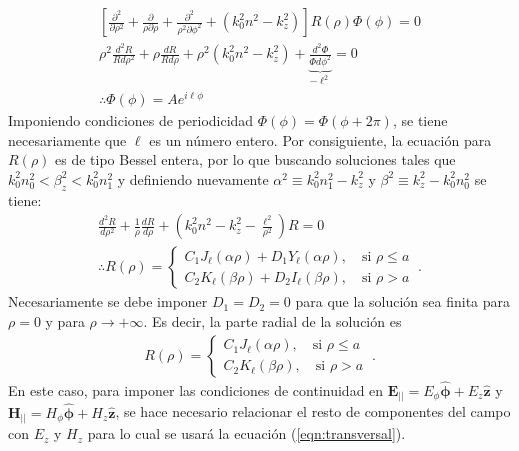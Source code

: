 \begin{align}
	\left[\frac{\partial^2}{\partial \rho^2} + \frac{\partial}{\rho\partial \rho} + \frac{\partial^2}{\rho^2\partial \phi^2} +\left( k_0^2n^2 - k_z^2 \right)\right]  R(\rho)\Phi(\phi) = 0
	\nonumber
	\\
\rho^2\frac{d^2 R}{Rd\rho^2} + \rho\frac{dR}{Rd\rho} + \rho^2\left( k_0^2n^2 - k_z^2 \right) + \underbrace{\frac{d^2 \Phi}{\Phi d\phi^2}}_{-\ell^2} = 0
\nonumber
\\
\therefore \Phi(\phi) = A e^{i\ell\phi}
\nonumber
\end{align}
Imponiendo condiciones de periodicidad $\Phi(\phi)=\Phi(\phi + 2\pi)$, se tiene necesariamente que $\ell$ es un número entero. Por consiguiente, la ecuación para $R(\rho)$ es de tipo Bessel entera, por lo que buscando soluciones tales que $k_0^2 n_0^2 < \beta_z^2 < k_0^2 n_1^2$ y definiendo nuevamente $\alpha^2 \equiv k_0^2n_1^2 - k_z^2$ y $\beta^2\equiv k_z^2 - k_0^2n_0^2$ se tiene:
\begin{align}
	\frac{d^2 R}{d\rho^2} + \frac{1}{\rho}\frac{dR}{d\rho} + \left( k_0^2n^2 - k_z^2 -\frac{\ell^2}{\rho^2}\right)R  = 0
	\nonumber
	\\
	\therefore R(\rho) = 
	\left\{
	\begin{matrix}	
	C_1 J_\ell (\alpha\rho) + D_1 Y_\ell (\alpha\rho), \quad \text{si } \rho \le a  
	\\
	C_2 K_\ell (\beta\rho) + D_2 I_\ell (\beta\rho), \quad \text{si } \rho > a  
	\end{matrix}
	\right.
	\ . \nonumber
\end{align}
Necesariamente se debe imponer $D_1 = D_2 = 0$ para que la solución sea finita para $\rho = 0$ y para $\rho \to +\infty$. Es decir, la parte radial de la solución es
\begin{align*}
 R(\rho) = 
	\left\{
	\begin{matrix}	
	C_1 J_\ell (\alpha\rho), \quad \text{si } \rho \le a  
	\\
	C_2 K_\ell (\beta\rho), \quad \text{si } \rho > a  
	\end{matrix}
	\right.
	\ . \nonumber
\end{align*}
En este caso, para imponer las condiciones de continuidad en $\textbf{E}_{||} = E_\phi \boldsymbol{\hat{\phi}} + E_z \hat{\textbf{z}}$ y $\textbf{H}_{||}= H_\phi \hat{\boldsymbol{\phi}} + H_z \hat{\textbf{z}}$, se hace necesario relacionar el resto de componentes del campo con $E_z$ y $H_z$ para lo cual se usará la ecuación (\ref{eqn:transversal}). 

